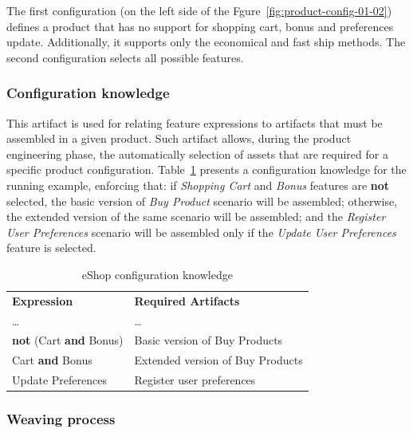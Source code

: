 \documentclass{acm_proc_article-sp}
\begin{document}
The first configuration (on the left side of the Fgure~\ref{fig:product-config-01-02}) defines a product that has no support for shopping cart, bonus and preferences update. Additionally, it supports only the economical and fast ship methods. The second configuration selects all possible features. 

\subsubsection{Configuration knowledge}

This artifact is used for relating feature expressions to artifacts that must be assembled in a given product. Such artifact allows, during the product engineering phase, the automatically selection of assets that are required for a specific product configuration. Table~\ref{tab:eshop-running-example} presents a configuration knowledge 
for the running example, enforcing that: if \emph{Shopping Cart} and \emph{Bonus} features are {\bf not} selected, the 
basic version of \emph{Buy Product} scenario will be assembled; otherwise, the extended version of the same 
scenario will be assembled; and the \emph{Register User Preferences} scenario will be assembled only if the \emph{Update 
User Preferences} feature is selected.

\begin{table}[h]
\begin{center}
\caption{eShop configuration knowledge} \label{tab:eshop-running-example}
\begin{tabular}{ll}
   \hline\noalign{\smallskip}
  {\bf Expression} & {\bf Required Artifacts} \\
   \noalign{\smallskip}
   \hline
   \noalign{\smallskip}
    \ldots & \ldots \\
    {\bf not} (Cart {\bf and} Bonus)\hspace{2pt} & Basic version of Buy Products \\
    Cart {\bf and} Bonus & Extended version of Buy Products \\
    Update Preferences & Register user preferences	 \\       
  \hline
\end{tabular}
\end{center}
\end{table}


\subsubsection{Weaving process}
\end{document}
